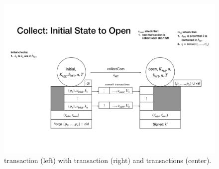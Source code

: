 \begin{figure}[h]

  \centering


  \includegraphics[width=\textwidth/2]{figures/SM_initial_open.pdf}

  \caption{\mtxInit{} transaction (left) with \mtxCCom{} transaction
    (right) and \mtxCom{} transactions (center).}
  \label{fig:SM_initial_open}

\end{figure}



